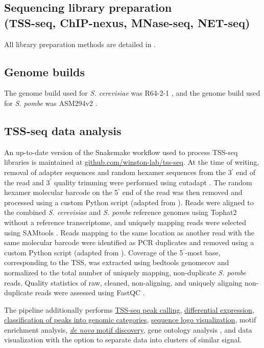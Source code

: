 \subsection{Sequencing library preparation\\(TSS-seq, ChIP-nexus, MNase-seq, NET-seq)}

All library preparation methods are detailed in \citet{doris2018}.

\subsection{Genome builds}

The genome build used for \textit{S. cerevisiae} was R64-2-1 \citep{engel2014}, and the genome build used for \textit{S. pombe} was ASM294v2 \citep{wood2002}.

\subsection{TSS-seq data analysis}

An up-to-date version of the Snakemake \citep{koster2012} workflow used to process TSS-seq libraries is maintained at \href{https://github.com/winston-lab/tss-seq}{github.com/winston-lab/tss-seq}.
At the time of writing, removal of adapter sequences and random hexamer sequences from the 3$^\prime$ end of the read and 3$^\prime$ quality trimming were performed using cutadapt \citep{martin2011}.
The random hexamer molecular barcode on the 5$^\prime$ end of the read was then removed and processed using a custom Python script (adapted from \citet{mayer2015}).
Reads were aligned to the combined \textit{S. cerevisiae} and \textit{S. pombe} reference genomes using Tophat2 \citep{kim2013} without a reference transcriptome, and uniquely mapping reads were selected using SAMtools \citep{li2009}.
Reads mapping to the same location as another read with the same molecular barcode were identified as PCR duplicates and removed using a custom Python script (adapted from \citet{mayer2015}).
Coverage of the 5$^\prime$-most base, corresponding to the TSS, was extracted using bedtools genomecov \citep{quinlan2010} and normalized to the total number of uniquely mapping, non-duplicate \textit{S. pombe} reads.
Quality statistics of raw, cleaned, non-aligning, and uniquely aligning non-duplicate reads were assessed using FastQC \citep{andrews2010}.

The pipeline additionally performs \hyperref[subsubsec:tss_peak_calling]{TSS-seq peak calling}, \hyperref[subsubsec:tss_differential_expression]{differential expression}, \hyperref[subsubsec:tss_peak_classification]{classification of peaks into genomic categories}, \hyperref[subsubsec:tss_seqlogos]{sequence logo visualization}, motif enrichment analysis, \hyperref[subsubsec:denovo_motif_discovery]{\textit{de novo} motif discovery}, gene ontology analysis \citep{young2010}, and data visualization with the option to separate data into clusters of similar signal.

